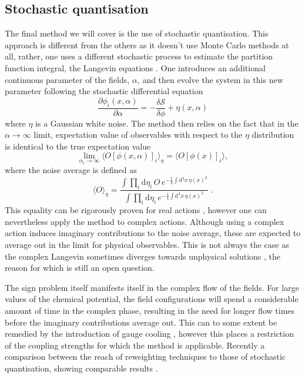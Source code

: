 \subsection{Stochastic quantisation}

The final method we will cover is the use of stochastic quantisation. This
approach is different from the others as it doesn't use Monte Carlo methods at
all, rather, one uses a different stochastic process to estimate the partition
function integral, the Langevin equations \citep{Parisi:1980ys}. One introduces
an additional continuous parameter of the fields, $\alpha$, and then evolve the
system in this new parameter following the stochastic differential equation
%
\begin{equation}
  \frac{\partial \phi_i (x, \alpha)}{\partial \alpha} = - \frac{\delta
    \mathcal{S}}{\delta \phi} + \eta(x,\alpha)
\end{equation}
%
where $\eta$ is a Gaussian white noise. The method then relies on the fact that
in the $\alpha \to \infty$ limit, expectation value of observables with respect
to the $\eta$ distribution is identical to the true expectation value
%
\begin{equation}
  \lim_{\alpha_i\to\infty} \big\langle O [\phi(x,\alpha)]_i \big\rangle_{\eta}
    = \big\langle O [\phi(x)]_i \big\rangle,
\end{equation}
%
where the noise average is defined as
%
\begin{equation}
  \big\langle O \big\rangle_{\eta} =
  \frac{\int \prod_i \mathrm{d} \eta_i \,O\, e^{-\frac{1}{4}\int \mathrm{d}^4
      x\, \eta(x)^2}}{\int \prod_i \mathrm{d} \eta_i \, e^{-\frac{1}{4}\int
      \mathrm{d}^4 x\, \eta(x)^2}}\;.
\end{equation}
%
This equality can be rigorously proven for real actions \citep{Huffel:2003hf},
however one can nevertheless apply the method to complex actions. Although using
a complex action induces imaginary contributions to the noise average, these are
expected to average out in the limit for physical observables. This is not
always the case as the complex Langevin sometimes diverges towards unphysical
solutions \citep{Ambjorn:1985iw}, the reason for which is still an open question.

The sign problem itself manifests itself in the complex flow of the fields. For
large values of the chemical potential, the field configurations will spend a
considerable amount of time in the complex phase, resulting in the need for
longer flow times before the imaginary contributions average out. This can to
some extent be remedied by the introduction of gauge cooling
\citep{Seiler:2012wz}, however this places a restriction of the coupling
strengths for which the method is applicable. Recently a comparison between the
reach of reweighting techniques to those of stochastic quantisation, showing
comparable results \citep{Fodor:2015doa}.
